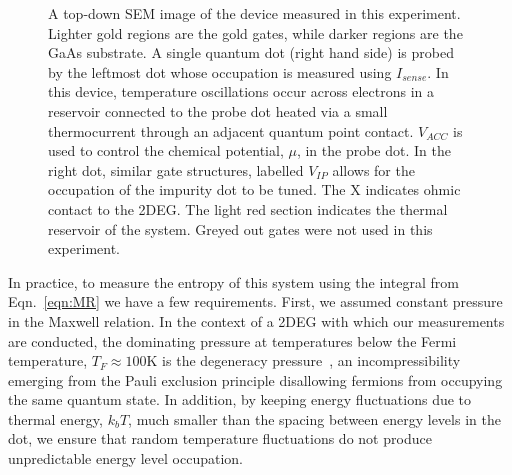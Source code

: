 \begin{figure}[h]
\centering
{}
\caption{ A top-down SEM image of the device measured in this experiment. Lighter gold regions are the gold gates, while darker regions are the GaAs substrate. A single quantum dot (right hand side) is probed by the leftmost dot whose occupation is measured using $I_{sense}$. In this device, temperature oscillations occur across electrons in a reservoir connected to the probe dot heated via a small thermocurrent through an adjacent quantum point contact. $V_{ACC}$ is used to control the chemical potential, $\mu$, in the probe dot. In the right dot, similar gate structures, labelled $V_{IP}$ allows for the occupation of the impurity dot to be tuned. The X indicates ohmic contact to the 2DEG. The light red section indicates the thermal reservoir of the system. Greyed out gates were not used in this experiment.}
\label{fig:device}       %
\end{figure}


In practice, to measure the entropy of this system using the integral from Eqn.~\ref{eqn:MR} we have a few requirements. First, we assumed constant pressure in the Maxwell relation. In the context of a \ac{2DEG} with which our measurements are conducted, the dominating pressure at temperatures below the Fermi temperature, $T_F \approx 100$K is the degeneracy pressure~\cite{ashcroftmermin}, an incompressibility emerging from the Pauli exclusion principle disallowing fermions from occupying the same quantum state. In addition, by keeping energy fluctuations due to thermal energy, $k_bT$, much smaller than the spacing between energy levels in the dot, we ensure that random temperature fluctuations do not produce unpredictable energy level occupation.


